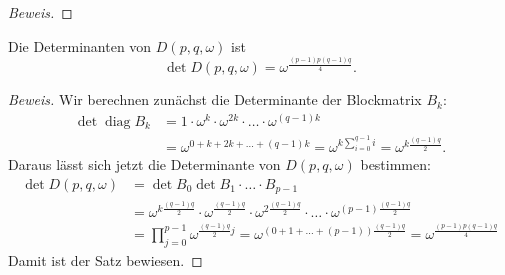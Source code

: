 \begin{proof}[Beweis]
\end{proof}

\begin{satz}
\label{buch:diskret:faktorisierung:satz:detD}
Die Determinanten von $D(p,q,\omega)$ ist
\[
\det D(p,q,\omega)
=
\omega^{\frac{(p-1)p(q-1)q}4}.
\]
\end{satz}

\begin{proof}[Beweis]
Wir berechnen zunächst die Determinante der Blockmatrix $B_k$:
\begin{align*}
\det \operatorname{diag}B_k
&=
1\cdot \omega^k\cdot \omega^{2k} \cdot \ldots \cdot \omega^{(q-1)k}
\\
&=
\omega^{0+k+2k+\dots+(q-1)k}
=
\omega^{k\sum_{i=0}^{q-1}i}
=
\omega^{k\frac{(q-1)q}2}.
\end{align*}
Daraus lässt sich jetzt die Determinante von $D(p,q,\omega)$ bestimmen:
\begin{align*}
\det D(p,q,\omega)
&=
\det B_0\det B_1\cdot\ldots\cdot B_{p-1}
\\
&=
\omega^{k\frac{(q-1)q}2}
\cdot
\omega^{\frac{(q-1)q}2}
\cdot
\omega^{2\frac{(q-1)q}2}
\cdot
\ldots
\cdot
\omega^{(p-1)\frac{(q-1)q}2}
\\
&=
\prod_{j=0}^{p-1}
\omega^{\frac{(q-1)q}2j}
=
\omega^{(0+1+\dots+(p-1))\frac{(q-1)q}2}
=
\omega^{\frac{(p-1)p(q-1)q}4}
\end{align*}
Damit ist der Satz bewiesen.
\end{proof}

